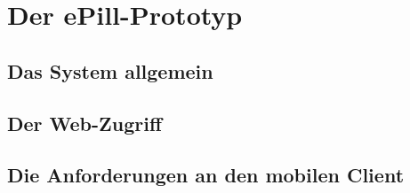 \section{Der ePill-Prototyp}
\subsection{Das System allgemein}
\subsection{Der Web-Zugriff}
\subsection{Die Anforderungen an den mobilen Client}